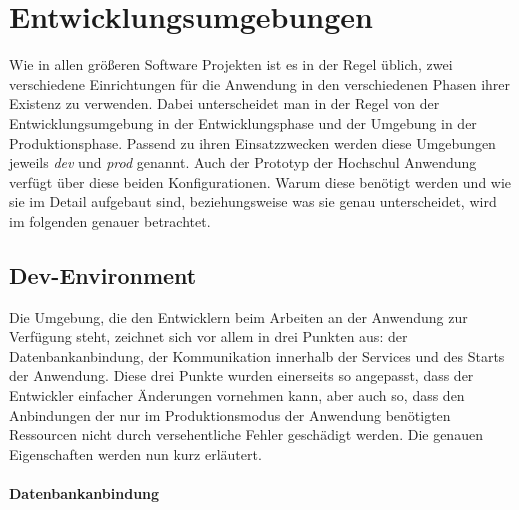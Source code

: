 \chapter{Entwicklungsumgebungen}
\label{sec:environments}

Wie in allen größeren Software Projekten ist es in der Regel üblich, zwei verschiedene Einrichtungen für die Anwendung in den verschiedenen Phasen ihrer Existenz zu verwenden. Dabei unterscheidet man in der Regel von der Entwicklungsumgebung in der Entwicklungsphase und der Umgebung in der Produktionsphase. Passend zu ihren Einsatzzwecken werden diese Umgebungen jeweils \textit{dev} und \textit{prod} genannt. Auch der Prototyp der Hochschul Anwendung verfügt über diese beiden Konfigurationen. Warum diese benötigt werden und wie sie im Detail aufgebaut sind, beziehungsweise was sie genau unterscheidet, wird im folgenden genauer betrachtet.

\section{Dev-Environment}

Die Umgebung, die den Entwicklern beim Arbeiten an der Anwendung zur Verfügung steht, zeichnet sich vor allem in drei Punkten aus: der Datenbankanbindung, der Kommunikation innerhalb der Services und des Starts der Anwendung. Diese drei Punkte wurden einerseits so angepasst, dass der Entwickler einfacher Änderungen vornehmen kann, aber auch so, dass den Anbindungen der nur im Produktionsmodus der Anwendung benötigten Ressourcen nicht durch versehentliche Fehler geschädigt werden. Die genauen Eigenschaften werden nun kurz erläutert.

\subsubsection{Datenbankanbindung}

